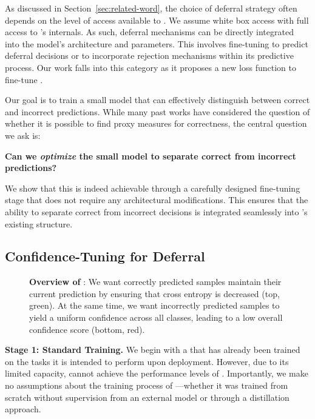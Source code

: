 As discussed in Section~\ref{sec:related-word}, the choice of deferral strategy often depends on the level of access available to \smallmodel. We assume white box access with full access to \smallmodel's internals. As such, deferral mechanisms can be directly integrated into the model's architecture and parameters. This involves fine-tuning \smallmodel to predict deferral decisions or to incorporate rejection mechanisms within its predictive process. Our work falls into this category as it proposes a new loss function to fine-tune \smallmodel. 

Our goal is to train a small model that can effectively distinguish between correct and incorrect predictions. While many past works have considered the question of whether it is possible to find proxy measures for correctness, the central question we ask is: 

\begin{center}
\textbf{Can we \emph{optimize} the small model \smallmodel to separate correct from incorrect predictions?}
\end{center}

We show that this is indeed achievable through a carefully designed fine-tuning stage that does not require any architectural modifications. This ensures that the ability to separate correct from incorrect decisions is integrated seamlessly into \smallmodel's existing structure.


\subsection{Confidence-Tuning for Deferral}

\begin{figure}
    \centering
    \resizebox{\linewidth}{!}{
    
    }
    \caption[Overview of \loss.]{\textbf{Overview of \loss}: We want correctly predicted samples maintain their current prediction by ensuring that cross entropy is decreased (top, green). At the same time, we want incorrectly predicted samples to yield a uniform confidence across all classes, leading to a low overall confidence score (bottom, red).}
    \label{fig:opt_goal}
\end{figure}

\textbf{Stage 1: Standard Training.} We begin with a \smallmodel that has already been trained on the tasks it is intended to perform upon deployment. However, due to its limited capacity, \smallmodel cannot achieve the performance levels of \bigmodel. Importantly, we make no assumptions about the training process of \smallmodel—whether it was trained from scratch without supervision from an external model or through a distillation approach.

